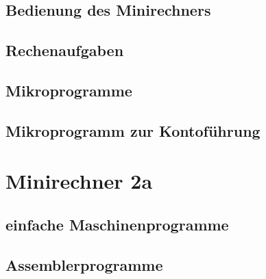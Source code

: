 \documentclass[paper=a4, fontsize=11pt]{scrartcl}
\numberwithin{equation}{section}
\numberwithin{figure}{section}
\numberwithin{table}{section}
\begin{document}
\subsection{Bedienung des Minirechners}

\subsection{Rechenaufgaben}

\subsection{Mikroprogramme}

\subsection{Mikroprogramm zur Kontoführung}


\newpage

\section{Minirechner 2a}

\subsection{einfache Maschinenprogramme}

\subsection{Assemblerprogramme}
\end{document}
